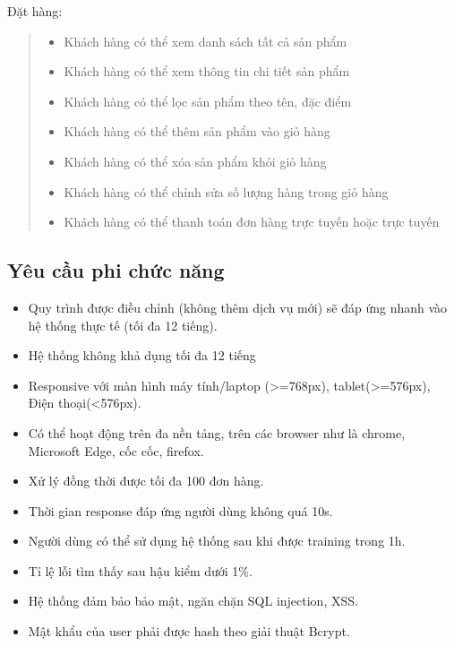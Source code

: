 Đặt hàng:
\begin{quote}
    \begin{itemize}
        \item Khách hàng có thể xem danh sách tất cả sản phẩm
        \item Khách hàng có thể xem thông tin chi tiết sản phẩm
        \item Khách hàng có thể lọc sản phẩm theo tên, đặc điểm
        \item Khách hàng có thể thêm sản phẩm vào giỏ hàng
        \item Khách hàng có thể xóa sản phẩm khỏi giỏ hàng
        \item Khách hàng có thể chỉnh sửa số lượng hàng trong giỏ hàng
        \item Khách hàng có thể thanh toán đơn hàng trực tuyến hoặc trực tuyến
    \end{itemize}
\end{quote}

\subsection{Yêu cầu phi chức năng}
\begin{itemize}
    \item Quy trình được điều chỉnh (không thêm dịch vụ mới) sẽ đáp ứng nhanh vào hệ thống thực tế (tối đa 12 tiếng).
    \item Hệ thống không khả dụng tối đa 12 tiếng
    \item Responsive với màn hình máy tính/laptop (>=768px), tablet(>=576px), Điện thoại(<576px).
    \item Có thể hoạt động trên đa nền tảng, trên các browser như là chrome, Microsoft Edge, cốc cốc, firefox.
    \item Xử lý đồng thời được tối đa 100 đơn hàng.
    \item Thời gian response đáp ứng người dùng không quá 10s.
    \item Người dùng có thể sử dụng hệ thống sau khi được training trong 1h.
    \item Tỉ lệ lỗi tìm thấy sau hậu kiểm dưới 1\%.
    \item Hệ thống đảm bảo bảo mật, ngăn chặn SQL injection, XSS.
    \item Mật khẩu của user phải được hash theo giải thuật Bcrypt.

\end{itemize}